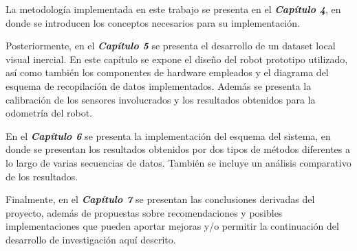 La metodología implementada en este trabajo se presenta en el \textit{\textbf{Capítulo 4}}, en donde se introducen los conceptos necesarios para su implementación.

Posteriormente, en el \textit{\textbf{Capítulo 5}} se presenta el desarrollo de un dataset local visual inercial. En este capítulo se expone el diseño del robot prototipo utilizado, así como también los componentes de hardware empleados y el diagrama del esquema de recopilación de datos implementados. Además se presenta la calibración de los sensores involucrados y los resultados obtenidos para la odometría del robot.

En el \textit{\textbf{Capítulo 6}} se presenta la implementación del esquema del sistema, en donde se presentan los resultados obtenidos por dos tipos de métodos diferentes a lo largo de varias secuencias de datos. También se incluye un análisis comparativo de los resultados.


Finalmente, en el \textit{\textbf{Capítulo 7}} se presentan las conclusiones derivadas del proyecto, además de propuestas sobre recomendaciones y posibles implementaciones que pueden aportar mejoras y/o permitir la continuación del desarrollo de investigación aquí descrito.

